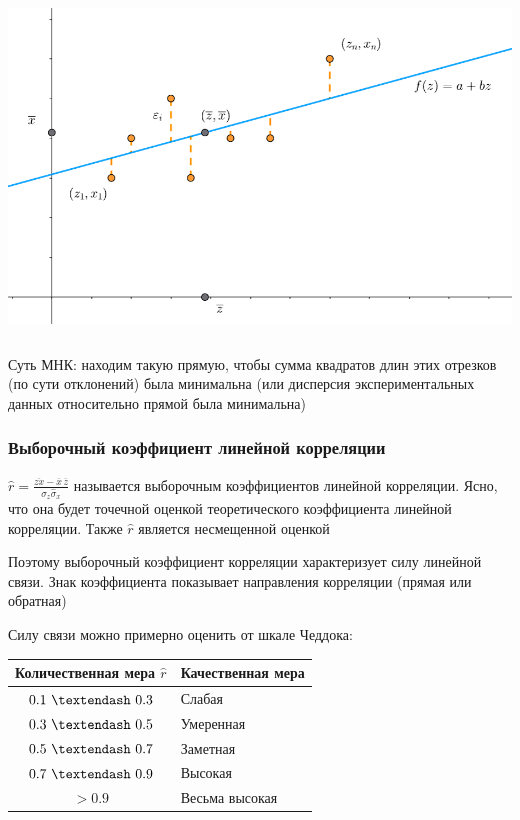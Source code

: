 \documentclass[12pt]{article}
\begin{document}
\begin{center}
    \includegraphics[height=9cm]{mathstat/images/mathstat_2025_04_08_1}
\end{center}

Суть МНК: находим такую прямую, чтобы сумма квадратов длин этих отрезков (по сути отклонений) была минимальна 
(или дисперсия экспериментальных данных относительно прямой была минимальна)


\subsubsection{Выборочный коэффициент линейной корреляции}

\hypertarget{selective_coefficient_linear_correlation}{}

\Def $\hat r = \frac{\overline{z x} - \overline{x} \, \overline{z}}{\hat \sigma_z \hat \sigma_x}$ называется выборочным коэффициентов 
линейной корреляции. Ясно, что она будет точечной оценкой теоретического коэффициента линейной корреляции. 
Также $\hat r$ является несмещенной оценкой

Поэтому выборочный коэффициент корреляции характеризует силу линейной связи. Знак коэффициента показывает направления корреляции (прямая или обратная)

Силу связи можно примерно оценить от шкале Чеддока:

\smallvspace

\begin{tabular}{c|l}
    Количественная мера $\hat r$ & Качественная мера \\
    \hline
    $0.1 \ \textendash \ 0.3$ & Слабая \\
    $0.3 \ \textendash \ 0.5$ & Умеренная \\
    $0.5 \ \textendash \ 0.7$ & Заметная \\
    $0.7 \ \textendash \ 0.9$ & Высокая \\
    $> 0.9$ & Весьма высокая \\
\end{tabular}
\end{document}
